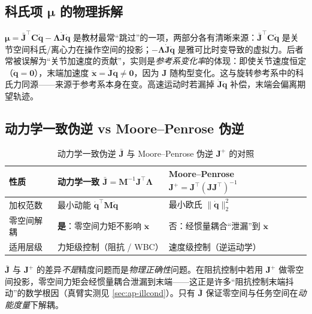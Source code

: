 \subsection{科氏项 \texorpdfstring{$\boldsymbol\mu$}{mu} 的物理拆解}
\label{sec:os-mu}

$\boldsymbol\mu=\bar{\mathbf J}^\top\mathbf C\dot{\mathbf q}-\boldsymbol\Lambda\dot{\mathbf J}\dot{\mathbf q}$ 是教材最常“跳过”的一项，两部分各有清晰来源：$\bar{\mathbf J}^\top\mathbf C\dot{\mathbf q}$ 是关节空间科氏/离心力在操作空间的投影；$-\boldsymbol\Lambda\dot{\mathbf J}\dot{\mathbf q}$ 是雅可比时变导致的虚拟力。后者常被误解为“关节加速度的贡献”，实则是\emph{参考系变化率}的体现：即使关节速度恒定（$\ddot{\mathbf q}=\mathbf 0$），末端加速度 $\ddot{\mathbf x}=\dot{\mathbf J}\dot{\mathbf q}\neq\mathbf 0$，因为 $\mathbf J$ 随构型变化。这与旋转参考系中的科氏力同源——来源于参考系本身在变。高速运动时若漏掉 $\dot{\mathbf J}\dot{\mathbf q}$ 补偿，末端会偏离期望轨迹。

\subsection{动力学一致伪逆 vs Moore--Penrose 伪逆}
\label{sec:os-jbar-vs-pinv}

\begin{table}[H]\centering\small
\caption{动力学一致伪逆 $\bar{\mathbf J}$ 与 Moore--Penrose 伪逆 $\mathbf J^+$ 的对照}
\label{tab:os-jbar-vs-pinv}
\begin{tabular}{p{} p{} p{}}
\toprule
性质 & 动力学一致 $\bar{\mathbf J}=\mathbf M^{-1}\mathbf J^\top\boldsymbol\Lambda$ & Moore--Penrose $\mathbf J^+=\mathbf J^\top(\mathbf J\mathbf J^\top)^{-1}$ \\
\midrule
加权范数 & 最小动能 $\dot{\mathbf q}^\top\mathbf M\dot{\mathbf q}$ & 最小欧氏 $\|\dot{\mathbf q}\|_2^2$ \\
零空间解耦 & \textbf{是}：零空间力矩不影响 $\ddot{\mathbf x}$ & 否：经惯量耦合“泄漏”到 $\ddot{\mathbf x}$ \\
适用层级 & 力矩级控制（阻抗 / WBC） & 速度级控制（逆运动学） \\
\bottomrule
\end{tabular}
\end{table}

\begin{insight}
$\bar{\mathbf J}$ 与 $\mathbf J^+$ 的差异\emph{不是}精度问题而是\emph{物理正确性}问题。在阻抗控制中若用 $\mathbf J^+$ 做零空间投影，零空间力矩会经惯量耦合泄漏到末端——这正是许多“阻抗控制末端抖动”的数学根因（真臂实测见 \cref{sec:ap-illcond}）。只有 $\bar{\mathbf J}$ 保证零空间与任务空间在\emph{动能度量}下解耦。
\end{insight}

